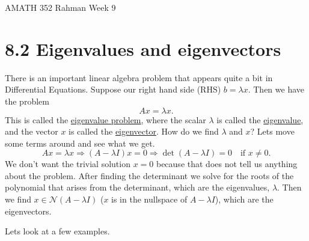 \documentclass[reqno]{amsart}
\theoremstyle{definition}
\begin{document}
\begin{flushleft}
{\sc \Large AMATH 352 Rahman} \hfill Week 9
\bigskip
\end{flushleft}

\newcommand{\R}{\mathbb{R}}
\newcommand{\N}{\mathbb{N}}
\newcommand{\Z}{\mathbb{Z}}
\newcommand{\Q}{\mathbb{Q}}
\renewcommand{\CancelColor}{\color{red}}
\newcommand{\?}{\stackrel{?}{=}}
\renewcommand{\varphi}{\phi}
\newcommand{\card}{\text{Card}}
\newcommand{\bigzero}{\text{\Huge 0}}
\newcommand{\curvearrowdown}{{\color{red}\rotatebox{90}{$\curvearrowleft$}}}
\newcommand{\curvearrowup}{{\color{red}\rotatebox{90}{$\curvearrowright$}}}

\newcommand*\circled[1]{\color{red}\tikz[baseline=(char.base)]{
            \node[shape=circle,draw,inner sep=2pt] (char) {#1};}}



\section*{8.2 Eigenvalues and eigenvectors}

There is an important linear algebra problem that appears quite a bit in Differential Equations.  Suppose our right hand side (RHS) $b = \lambda x$.  Then we have the problem
%
\begin{equation}
Ax = \lambda x.
\end{equation}
%
This is called the {\color{red}\underline{eigenvalue problem}}, where the scalar $\lambda$ is called the {\color{red} \underline{eigenvalue}}, and the vector $x$ is called the {\color{red}\underline{eigenvector}}.  {\color{blue}How do we find $\lambda$ and $x$}?  Lets move some terms around and see what we get.
%
\begin{equation*}
Ax = \lambda x \Rightarrow (A-\lambda I)x = 0 \Rightarrow \det(A-\lambda I) = 0 \quad \text{if $x\neq 0$}.
\end{equation*}
%
We don't want the trivial solution $x=0$ because that does not tell us anything about the problem.
After finding the determinant we solve for the roots of the polynomial that arises from the determinant, which are the eigenvalues, $\lambda$.  Then we find $x \in \mathcal{N}(A-\lambda I)$ ($x$ is in the nullspace of $A-\lambda I$), which are the eigenvectors.

Lets look at a few examples.
\end{document}
